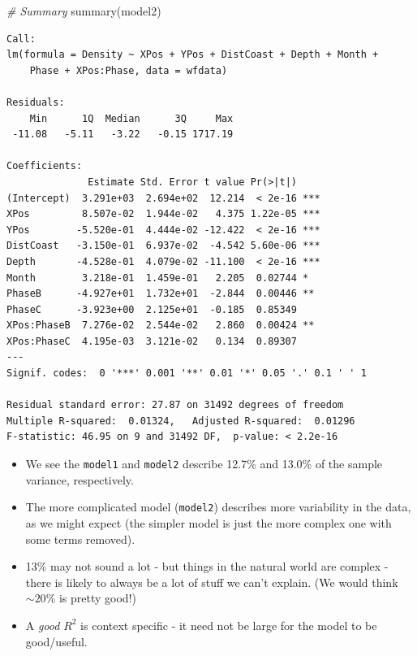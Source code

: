 \documentclass[
  oneside]{krantz}
\newenvironment{Shaded}{\begin{snugshade}}{\end{snugshade}}
\newcommand{\CommentTok}[1]{\textcolor[rgb]{0.56,0.35,0.01}{\textit{#1}}}
\newcommand{\FunctionTok}[1]{\textcolor[rgb]{0.00,0.00,0.00}{#1}}
\newcommand{\NormalTok}[1]{#1}
\providecommand{\tightlist}{%
  \setlength{\itemsep}{0pt}\setlength{\parskip}{0pt}}
\begin{document}
\normalsize

\begin{Shaded}
\begin{Highlighting}[]
\CommentTok{\# Summary}
\FunctionTok{summary}\NormalTok{(model2)}
\end{Highlighting}
\end{Shaded}

\begin{verbatim}
Call:
lm(formula = Density ~ XPos + YPos + DistCoast + Depth + Month + 
    Phase + XPos:Phase, data = wfdata)

Residuals:
    Min      1Q  Median      3Q     Max 
 -11.08   -5.11   -3.22   -0.15 1717.19 

Coefficients:
              Estimate Std. Error t value Pr(>|t|)    
(Intercept)  3.291e+03  2.694e+02  12.214  < 2e-16 ***
XPos         8.507e-02  1.944e-02   4.375 1.22e-05 ***
YPos        -5.520e-01  4.444e-02 -12.422  < 2e-16 ***
DistCoast   -3.150e-01  6.937e-02  -4.542 5.60e-06 ***
Depth       -4.528e-01  4.079e-02 -11.100  < 2e-16 ***
Month        3.218e-01  1.459e-01   2.205  0.02744 *  
PhaseB      -4.927e+01  1.732e+01  -2.844  0.00446 ** 
PhaseC      -3.923e+00  2.125e+01  -0.185  0.85349    
XPos:PhaseB  7.276e-02  2.544e-02   2.860  0.00424 ** 
XPos:PhaseC  4.195e-03  3.121e-02   0.134  0.89307    
---
Signif. codes:  0 '***' 0.001 '**' 0.01 '*' 0.05 '.' 0.1 ' ' 1

Residual standard error: 27.87 on 31492 degrees of freedom
Multiple R-squared:  0.01324,   Adjusted R-squared:  0.01296 
F-statistic: 46.95 on 9 and 31492 DF,  p-value: < 2.2e-16
\end{verbatim}

\normalsize

\begin{itemize}
\tightlist
\item
  We see the \texttt{model1} and \texttt{model2} describe 12.7\% and 13.0\% of the sample variance, respectively.
\item
  The more complicated model (\texttt{model2}) describes more variability in the data, as we might expect (the simpler model is just the more complex one with some terms removed).
\item
  13\% may not sound a lot - but things in the natural world are complex - there is likely to always be a lot of stuff we can't explain. (We would think \(\sim 20\%\) is pretty good!)
\item
  A \emph{good} \(R^2\) is context specific - it need not be large for the model to be good/useful.
\end{itemize}
\end{document}

